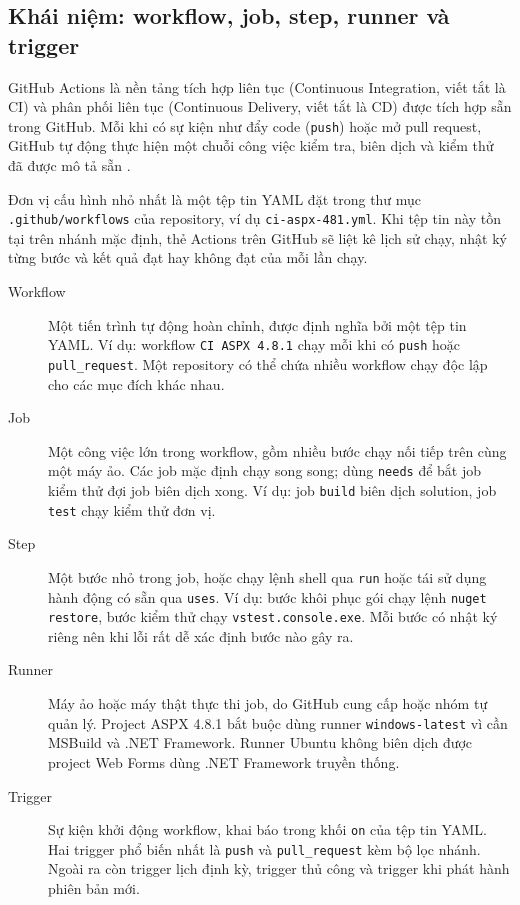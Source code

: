 \subsection{Khái niệm: workflow, job, step, runner và trigger}

GitHub Actions là nền tảng tích hợp liên tục (Continuous Integration, viết tắt là CI)
và phân phối liên tục (Continuous Delivery, viết tắt là CD) được tích hợp sẵn trong GitHub.
Mỗi khi có sự kiện như đẩy code (\verb|push|) hoặc mở pull request, GitHub tự động thực hiện
một chuỗi công việc kiểm tra, biên dịch và kiểm thử đã được mô tả sẵn \cite{ghactions}.

Đơn vị cấu hình nhỏ nhất là một tệp tin YAML đặt trong thư mục
\verb|.github/workflows| của repository, ví dụ \verb|ci-aspx-481.yml|.
Khi tệp tin này tồn tại trên nhánh mặc định, thẻ Actions trên GitHub sẽ liệt kê
lịch sử chạy, nhật ký từng bước và kết quả đạt hay không đạt của mỗi lần chạy.

\begin{description}
\item[Workflow] Một tiến trình tự động hoàn chỉnh, được định nghĩa bởi một tệp tin YAML.
Ví dụ: workflow \verb|CI ASPX 4.8.1| chạy mỗi khi có \verb|push| hoặc \verb|pull_request|.
Một repository có thể chứa nhiều workflow chạy độc lập cho các mục đích khác nhau.
\item[Job] Một công việc lớn trong workflow, gồm nhiều bước chạy nối tiếp trên cùng một máy ảo.
Các job mặc định chạy song song; dùng \verb|needs| để bắt job kiểm thử đợi job biên dịch xong.
Ví dụ: job \verb|build| biên dịch solution, job \verb|test| chạy kiểm thử đơn vị.
\item[Step] Một bước nhỏ trong job, hoặc chạy lệnh shell qua \verb|run| hoặc tái sử dụng hành động có sẵn qua \verb|uses|.
Ví dụ: bước khôi phục gói chạy lệnh \verb|nuget restore|, bước kiểm thử chạy \verb|vstest.console.exe|.
Mỗi bước có nhật ký riêng nên khi lỗi rất dễ xác định bước nào gây ra.
\item[Runner] Máy ảo hoặc máy thật thực thi job, do GitHub cung cấp hoặc nhóm tự quản lý.
Project ASPX 4.8.1 bắt buộc dùng runner \verb|windows-latest| vì cần MSBuild và .NET Framework.
Runner Ubuntu không biên dịch được project Web Forms dùng .NET Framework truyền thống.
\item[Trigger] Sự kiện khởi động workflow, khai báo trong khối \verb|on| của tệp tin YAML.
Hai trigger phổ biến nhất là \verb|push| và \verb|pull_request| kèm bộ lọc nhánh.
Ngoài ra còn trigger lịch định kỳ, trigger thủ công và trigger khi phát hành phiên bản mới.
\end{description}

